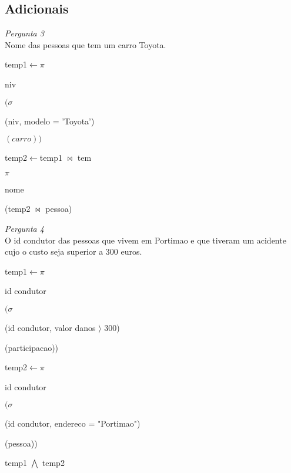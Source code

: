 \documentclass[12pt,a4paper]{article}
\begin{document}
\subsection*{Adicionais}
\textit{Pergunta 3}\\
Nome das pessoas que tem um carro Toyota.\\
\begin{center}
temp1$\longleftarrow \pi$\begin{tiny}
niv
\end{tiny}$(\sigma$ \begin{tiny}
(niv, modelo = 'Toyota')
\end{tiny}$(carro))$
\end{center}
\begin{center}
temp2$\longleftarrow$temp1 $\bowtie$ tem
\end{center}
\begin{center}
$\pi$ \begin{tiny}
nome
\end{tiny}(temp2 $\bowtie$ pessoa)
\end{center}
\textit{Pergunta 4}\\
O id condutor das pessoas que vivem em Portimao e que tiveram um acidente cujo o custo seja superior a 300 euros.\\
\begin{center}
temp1$\longleftarrow \pi$\begin{tiny}
id condutor
\end{tiny}$(\sigma $ \begin{tiny}
(id condutor, valor danos $\rangle$ 300)
\end{tiny}(participacao))
\end{center}
\begin{center}
temp2$\longleftarrow \pi$\begin{tiny}
id condutor
\end{tiny}$(\sigma $ \begin{tiny}
(id condutor, endereco = "Portimao")
\end{tiny}(pessoa))
\end{center}
\begin{center}
temp1 $\bigwedge$ temp2
\end{center}
\end{document}
